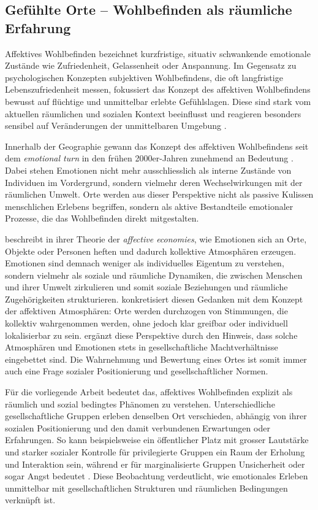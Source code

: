 \subsection{Gefühlte Orte -- Wohlbefinden als räumliche Erfahrung}

Affektives Wohlbefinden bezeichnet kurzfristige, situativ schwankende emotionale Zustände wie Zufriedenheit, Gelassenheit oder Anspannung. Im Gegensatz zu psychologischen Konzepten subjektiven Wohlbefindens, die oft langfristige Lebenszufriedenheit messen, fokussiert das Konzept des affektiven Wohlbefindens bewusst auf flüchtige und unmittelbar erlebte Gefühlslagen. Diese sind stark vom aktuellen räumlichen und sozialen Kontext beeinflusst und reagieren besonders sensibel auf Veränderungen der unmittelbaren Umgebung \parencite{dodgeChallengeDefiningWellbeing2012}.

Innerhalb der Geographie gewann das Konzept des affektiven Wohlbefindens seit dem \emph{emotional turn} in den frühen 2000er-Jahren zunehmend an Bedeutung \parencite{hoSocialGeographyIII2024}. Dabei stehen Emotionen nicht mehr ausschliesslich als interne Zustände von Individuen im Vordergrund, sondern vielmehr deren Wechselwirkungen mit der räumlichen Umwelt. Orte werden aus dieser Perspektive nicht als passive Kulissen menschlichen Erlebens begriffen, sondern als aktive Bestandteile emotionaler Prozesse, die das Wohlbefinden direkt mitgestalten.

\textcite{ahmedAffectiveEconomies2004} beschreibt in ihrer Theorie der \emph{affective economies}, wie Emotionen sich an Orte, Objekte oder Personen heften und dadurch kollektive Atmosphären erzeugen. Emotionen sind demnach weniger als individuelles Eigentum zu verstehen, sondern vielmehr als soziale und räumliche Dynamiken, die zwischen Menschen und ihrer Umwelt zirkulieren und somit soziale Beziehungen und räumliche Zugehörigkeiten strukturieren. \textcite{andersonAffectiveAtmospheres2009} konkretisiert diesen Gedanken mit dem Konzept der affektiven Atmosphären: Orte werden durchzogen von Stimmungen, die kollektiv wahrgenommen werden, ohne jedoch klar greifbar oder individuell lokalisierbar zu sein. \textcite{hoSocialGeographyIII2024} ergänzt diese Perspektive durch den Hinweis, dass solche Atmosphären und Emotionen stets in gesellschaftliche Machtverhältnisse eingebettet sind. Die Wahrnehmung und Bewertung eines Ortes ist somit immer auch eine Frage sozialer Positionierung und gesellschaftlicher Normen.

Für die vorliegende Arbeit bedeutet das, affektives Wohlbefinden explizit als räumlich und sozial bedingtes Phänomen zu verstehen. Unterschiedliche gesellschaftliche Gruppen erleben denselben Ort verschieden, abhängig von ihrer sozialen Positionierung und den damit verbundenen Erwartungen oder Erfahrungen. So kann beispielsweise ein öffentlicher Platz mit grosser Lautstärke und starker sozialer Kontrolle für privilegierte Gruppen ein Raum der Erholung und Interaktion sein, während er für marginalisierte Gruppen Unsicherheit oder sogar Angst bedeutet \parencite{collectiveSafeSpaceReconceptualization2014}. Diese Beobachtung verdeutlicht, wie emotionales Erleben unmittelbar mit gesellschaftlichen Strukturen und räumlichen Bedingungen verknüpft ist.

